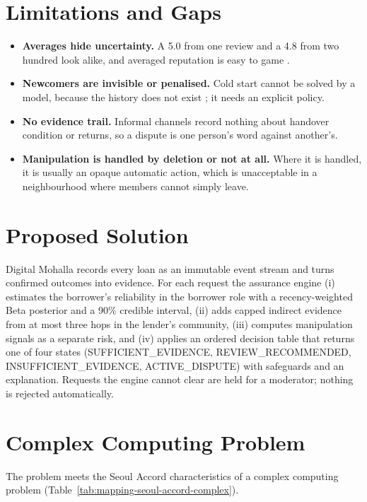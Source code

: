 \section{Limitations and Gaps}\label{sec:limitations-gaps}
\begin{itemize}
\item \textbf{Averages hide uncertainty.} A 5.0 from one review and a 4.8 from two hundred look alike, and averaged reputation is easy to game \cite{josang2007survey,resnick2000}.
\item \textbf{Newcomers are invisible or penalised.} Cold start cannot be solved by a model, because the history does not exist \cite{schein2002}; it needs an explicit policy.
\item \textbf{No evidence trail.} Informal channels record nothing about handover condition or returns, so a dispute is one person's word against another's.
\item \textbf{Manipulation is handled by deletion or not at all.} Where it is handled, it is usually an opaque automatic action, which is unacceptable in a neighbourhood where members cannot simply leave.
\end{itemize}

\section{Proposed Solution}\label{sec:proposed-solution}
Digital Mohalla records every loan as an immutable event stream and turns confirmed outcomes into evidence. For each request the assurance engine (i) estimates the borrower's reliability in the borrower role with a recency-weighted Beta posterior and a 90\% credible interval, (ii) adds capped indirect evidence from at most three hops in the lender's community, (iii) computes manipulation signals as a separate risk, and (iv) applies an ordered decision table that returns one of four states (SUFFICIENT\_EVIDENCE, REVIEW\_RECOMMENDED, INSUFFICIENT\_EVIDENCE, ACTIVE\_DISPUTE) with safeguards and an explanation. Requests the engine cannot clear are held for a moderator; nothing is rejected automatically.

\section{Complex Computing Problem}\label{sec:complex-computing-problem}
The problem meets the Seoul Accord characteristics of a complex computing problem (Table~\ref{tab:mapping-seoul-accord-complex}).

